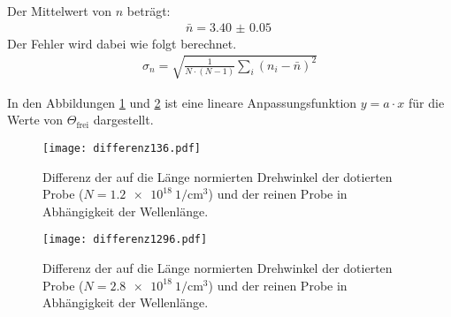 Der Mittelwert von $n$ beträgt:
\begin{align*}
  \bar{n} = \SI{3.40(5)}{}
\end{align*}
Der Fehler wird dabei wie folgt berechnet.
\begin{align*}
  \sigma_n = \sqrt{\frac{1}{N\cdot(N-1)} \sum_i (n_i - \bar{n})^2}
\end{align*}

In den Abbildungen \ref{fig:differenz136} und \ref{fig:differenz1296} ist eine lineare
Anpassungsfunktion $y=a \cdot x$ für die Werte von $\Theta_{\mathrm{frei}}$ dargestellt.

\begin{figure}[H]
  \centering
  \texttt{[image: differenz136.pdf]}
  \caption{Differenz der auf die Länge normierten Drehwinkel der dotierten Probe ($N = \SI{1.2e18}{1\per\centi\meter^3}$) und der reinen Probe in Abhängigkeit der Wellenlänge.}
  \label{fig:differenz136}
\end{figure}

\begin{figure}[H]
  \centering
  \texttt{[image: differenz1296.pdf]}
  \caption{Differenz der auf die Länge normierten Drehwinkel der dotierten Probe ($N = \SI{2.8e18}{1\per\centi\meter^3}$) und der reinen Probe in Abhängigkeit der Wellenlänge.}
  \label{fig:differenz1296}
\end{figure}
